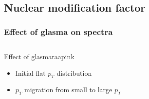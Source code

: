 \documentclass[aspectratio=169,11pt,usenames,dvipsnames]{beamer}
\begin{document}

\subsection{Nuclear modification factor}


\begin{frame}
    \frametitle{Effect of glasma on spectra}
    \vspace{-10pt}
    \begin{columns}[onlytextwidth,t]
        \begin{center}
            \begin{custombox2}{{\normalsize Effect of glasma}}{raapink}
                \small
                \begin{varwidth}{0.88\textwidth}
                \begin{itemize}\itemsep0em 
                    \itemsep0em 
                    \footnotesize
                    \item Initial flat $p_T$ distribution
                    \item $p_T$ migration from small to large $p_T$
                \end{itemize}
                \end{varwidth}
            \end{custombox2}


\end{center}
\end{columns}
\end{frame}
\end{document}

